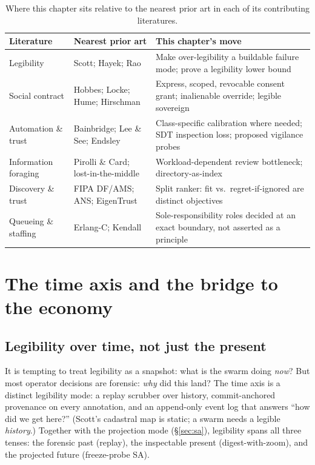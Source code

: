 \documentclass[11pt,a4paper]{article}
\theoremstyle{definition}
\theoremstyle{plain}
\begin{document}
\begin{table}[H]
\centering
\small
\renewcommand{\arraystretch}{1.3}
\begin{tabular}{@{}p{}p{}p{}@{}}
\toprule
\textbf{Literature} & \textbf{Nearest prior art} & \textbf{This chapter's move} \\
\midrule
Legibility & Scott; Hayek; Rao & Make over-legibility a buildable failure mode; prove a legibility lower bound \\
Social contract & Hobbes; Locke; Hume; Hirschman & Express, scoped, revocable consent grant; inalienable override; legible sovereign \\
Automation \& trust & Bainbridge; Lee \& See; Endsley & Class-specific calibration where needed; SDT inspection loss; proposed vigilance probes \\
Information foraging & Pirolli \& Card; lost-in-the-middle & Workload-dependent review bottleneck; directory-as-index \\
Discovery \& trust & FIPA DF/AMS; ANS; EigenTrust & Split ranker: fit vs.\ regret-if-ignored are distinct objectives \\
Queueing \& staffing & Erlang-C; Kendall & Sole-responsibility roles decided at an exact boundary, not asserted as a principle \\
\bottomrule
\end{tabular}
\caption{Where this chapter sits relative to the nearest prior art in each of its
contributing literatures.}
\label{tab:related}
\end{table}

\section{The time axis and the bridge to the economy}\label{sec:bridge}

\subsection{Legibility over time, not just the present}\label{sec:timeaxis}

It is tempting to treat legibility as a snapshot: what is the swarm doing
\emph{now}? But most operator decisions are forensic: \emph{why} did this land? The
time axis is a distinct legibility mode: a replay scrubber over history,
commit-anchored provenance on every annotation, and an append-only event log that
answers ``how did we get here?'' (Scott's cadastral map is static; a swarm needs a
legible \emph{history}.) Together with the projection mode
(\S\ref{sec:sa}), legibility spans all three tenses: the forensic past (replay), the
inspectable present (digest-with-zoom), and the projected future (freeze-probe SA).
\end{document}

